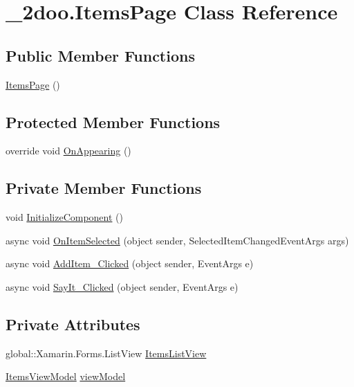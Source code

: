 \hypertarget{class__2doo_1_1_items_page}{
\section{\_\-2doo.ItemsPage Class Reference}
\label{class__2doo_1_1_items_page}
}
\subsection*{Public Member Functions}
\begin{CompactItemize}
\item 
\hyperlink{class__2doo_1_1_items_page_cca6286efb67f30a0b329b46ba03fca7}{ItemsPage} ()
\end{CompactItemize}
\subsection*{Protected Member Functions}
\begin{CompactItemize}
\item 
override void \hyperlink{class__2doo_1_1_items_page_a148952cd83870789da5468c14f7c93b}{OnAppearing} ()
\end{CompactItemize}
\subsection*{Private Member Functions}
\begin{CompactItemize}
\item 
void \hyperlink{class__2doo_1_1_items_page_d918932efb8a9bb7f74e6120d4b4badb}{InitializeComponent} ()
\item 
async void \hyperlink{class__2doo_1_1_items_page_2a00d5fc1ad2135f8313d4d9aefa74f6}{OnItemSelected} (object sender, SelectedItemChangedEventArgs args)
\item 
async void \hyperlink{class__2doo_1_1_items_page_937ceb8011b2c319bdce7b583c4bb555}{AddItem\_\-Clicked} (object sender, EventArgs e)
\item 
async void \hyperlink{class__2doo_1_1_items_page_298f1cb4d2e6a6c4b859161a2e599917}{SayIt\_\-Clicked} (object sender, EventArgs e)
\end{CompactItemize}
\subsection*{Private Attributes}
\begin{CompactItemize}
\item 
global::Xamarin.Forms.ListView \hyperlink{class__2doo_1_1_items_page_101e20bd06bf5aeed354ea04ad14cb8b}{ItemsListView}
\item 
\hyperlink{class__2doo_1_1_items_view_model}{ItemsViewModel} \hyperlink{class__2doo_1_1_items_page_855bf867d9810ff3f68f6a9f41a71382}{viewModel}
\end{CompactItemize}


